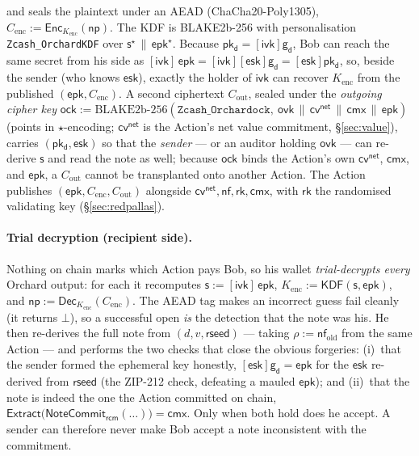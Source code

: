 \documentclass[11pt,a4paper]{article}
\theoremstyle{definition}
\newcommand{\nfsym}{\mathsf{nf}}
\newcommand{\cmx}{\mathsf{cmx}}
\newcommand{\cvsym}{\mathsf{cv}}
\newcommand{\rk}{\mathsf{rk}}
\newcommand{\NoteCommit}{\ensuremath{\mathsf{NoteCommit}}}
\newcommand{\Extract}{\ensuremath{\mathsf{Extract}}}
\newcommand{\ivk}{\ensuremath{\mathsf{ivk}}}
\newcommand{\ovk}{\ensuremath{\mathsf{ovk}}}
\newcommand{\pkd}{\ensuremath{\mathsf{pk_d}}}
\newcommand{\gd}{\ensuremath{\mathsf{g_d}}}
\newcommand{\rcm}{\ensuremath{\mathsf{rcm}}}
\begin{document}
and seals the plaintext under an AEAD (ChaCha20-Poly1305),
$C_{\mathrm{enc}} := \mathsf{Enc}_{K_{\mathrm{enc}}}(\mathsf{np})$. The KDF is
BLAKE2b-256 with personalisation \texttt{Zcash\_OrchardKDF} over
$\mathsf{s}^\star \,\|\, \mathsf{epk}^\star$. Because
$\pkd = [\ivk]\gd$, Bob can reach the same secret from his side as
$[\ivk]\,\mathsf{epk} = [\ivk][\mathsf{esk}]\gd = [\mathsf{esk}]\pkd$, so,
beside the sender (who knows $\mathsf{esk}$), exactly the holder of $\ivk$
can recover $K_{\mathrm{enc}}$ from the published
$(\mathsf{epk}, C_{\mathrm{enc}})$. A second ciphertext
$C_{\mathrm{out}}$, sealed under the \emph{outgoing cipher key}
$\mathsf{ock} := \mathrm{BLAKE2b\text{-}256}(\texttt{Zcash\_Orchardock},\
\ovk \,\|\, \cvsym^{\mathsf{net}} \,\|\, \cmx \,\|\, \mathsf{epk})$ (points in
$\star$-encoding; $\cvsym^{\mathsf{net}}$ is the Action's net value
commitment, \S\ref{sec:value}), carries
$(\pkd, \mathsf{esk})$ so that the \emph{sender} --- or an auditor holding $\ovk$
--- can re-derive $\mathsf{s}$ and read the note as well; because $\mathsf{ock}$
binds the Action's own $\cvsym^{\mathsf{net}}$, $\cmx$, and $\mathsf{epk}$, a $C_{\mathrm{out}}$
cannot be transplanted onto another Action. The Action publishes
$(\mathsf{epk}, C_{\mathrm{enc}}, C_{\mathrm{out}})$ alongside
$\cvsym^{\mathsf{net}}, \nfsym, \rk, \cmx$, with $\rk$ the randomised
validating key (\S\ref{sec:redpallas}).

\paragraph{Trial decryption (recipient side).} Nothing on chain marks which
Action pays Bob, so his wallet \emph{trial-decrypts every} Orchard output: for
each it recomputes $\mathsf{s} := [\ivk]\,\mathsf{epk}$,
$K_{\mathrm{enc}} := \mathsf{KDF}(\mathsf{s}, \mathsf{epk})$, and
$\mathsf{np} := \mathsf{Dec}_{K_{\mathrm{enc}}}(C_{\mathrm{enc}})$. The AEAD tag
makes an incorrect guess fail cleanly (it returns $\bot$), so a successful open
\emph{is} the detection that the note was his. He then re-derives the full note
from $(d, v, \mathsf{rseed})$ --- taking $\rho := \nfsym_{\mathrm{old}}$ from the
same Action --- and performs the two checks that close the obvious forgeries:
(i)~that the sender formed the ephemeral key honestly, $[\mathsf{esk}]\gd = \mathsf{epk}$
for the $\mathsf{esk}$ re-derived from $\mathsf{rseed}$ (the ZIP-212 check,
defeating a mauled $\mathsf{epk}$); and (ii)~that the note is indeed the one
the Action committed on chain, $\Extract\big(\NoteCommit_{\rcm}(\ldots)\big) = \cmx$. Only
when both hold does he accept. A sender can therefore never make Bob accept a
note inconsistent with the commitment.
\end{document}
